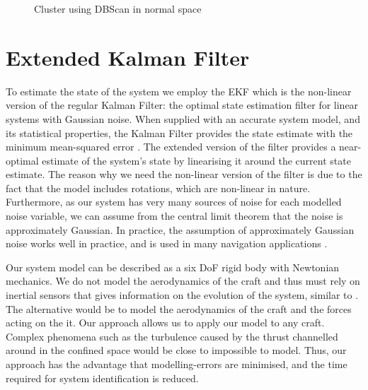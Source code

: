 \documentclass[]{article}
\begin{document}
{\begin{figure}[p]
	\caption{Cluster using DBScan in normal space}
	\label{fig:box_normal_clustering}
\end{figure}




\clearpage


\clearpage %
\section{Extended Kalman Filter} %
\label{sec:ekf}

To estimate the state of the system we employ the EKF which is the non-linear version of the regular Kalman Filter: the optimal state estimation filter for linear systems \cite{todo} with Gaussian noise.
When supplied with an accurate system model, and its statistical properties, the Kalman Filter provides the state estimate with the minimum mean-squared error \cite{todo}.
The extended version of the filter provides a near-optimal estimate of the system's state by linearising it around the current state estimate.
The reason why we need the non-linear version of the filter is due to the fact that the model includes rotations, which are non-linear in nature.
Furthermore, as our system has very many sources of noise for each modelled noise variable, we can assume from the central limit theorem that the noise is approximately Gaussian.
In practice, the assumption of approximately Gaussian noise works well in practice, and is used in many navigation applications \cite{todo}.


Our system model can be described as a six DoF rigid body with Newtonian mechanics.
We do not model the aerodynamics of the craft and thus must rely on inertial sensors that gives information on the evolution of the system, similar to  \cite{OpenPilotPaper}.
The alternative would be to model the aerodynamics of the craft and the forces acting on the it. Our approach allows us to apply our model to any craft.
Complex phenomena such as the turbulence caused by the thrust channelled around in the confined space would be close to impossible to model.
Thus, our approach has the advantage that modelling-errors are minimised, and the time required for system identification is reduced.

}
\end{document}
